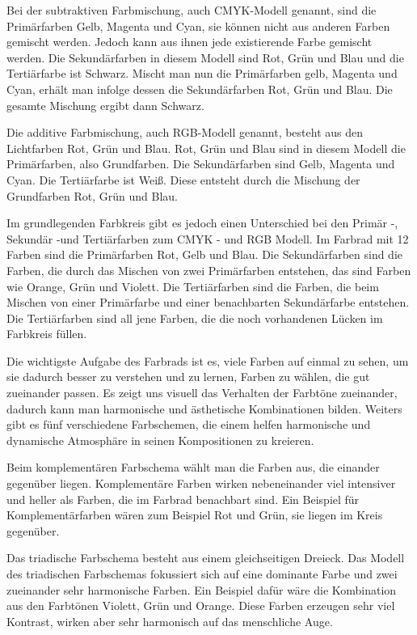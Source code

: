 Bei der subtraktiven Farbmischung, auch CMYK-Modell genannt, sind die Primärfarben Gelb, Magenta und Cyan, sie können nicht aus anderen Farben gemischt werden. Jedoch kann aus ihnen jede existierende Farbe gemischt werden. Die Sekundärfarben in diesem Modell sind Rot, Grün und Blau und die Tertiärfarbe ist Schwarz. Mischt man nun die Primärfarben gelb, Magenta und Cyan, erhält man infolge dessen die Sekundärfarben Rot, Grün und Blau. Die gesamte Mischung ergibt dann Schwarz.

Die additive Farbmischung, auch RGB-Modell genannt, besteht aus den Lichtfarben Rot, Grün und Blau. Rot, Grün und Blau sind in diesem Modell die Primärfarben, also Grundfarben. Die Sekundärfarben sind Gelb, Magenta und Cyan. Die Tertiärfarbe ist Weiß. Diese entsteht durch die Mischung der Grundfarben Rot, Grün und Blau.

Im grundlegenden Farbkreis gibt es jedoch einen Unterschied bei den Primär -, Sekundär -und Tertiärfarben zum CMYK - und RGB Modell. Im Farbrad mit 12 Farben sind die Primärfarben Rot, Gelb und Blau. Die Sekundärfarben sind die Farben, die durch das Mischen von zwei Primärfarben entstehen, das sind Farben wie Orange, Grün und Violett. Die Tertiärfarben sind die Farben, die beim Mischen von einer Primärfarbe und einer benachbarten Sekundärfarbe entstehen. Die Tertiärfarben sind all jene Farben, die die noch vorhandenen Lücken im Farbkreis füllen.


Die wichtigste Aufgabe des Farbrads ist es, viele Farben auf einmal zu sehen, um sie dadurch besser zu verstehen und zu lernen, Farben zu wählen, die gut zueinander passen. Es zeigt uns visuell das Verhalten der Farbtöne zueinander, dadurch kann man harmonische und ästhetische Kombinationen bilden.
Weiters gibt es fünf verschiedene Farbschemen, die einem helfen harmonische und dynamische Atmosphäre in seinen Kompositionen zu kreieren.

Beim komplementären Farbschema wählt man die Farben aus, die einander gegenüber liegen. Komplementäre Farben wirken nebeneinander viel intensiver und heller als Farben, die im Farbrad benachbart sind. Ein Beispiel für Komplementärfarben wären zum Beispiel Rot und Grün, sie liegen im Kreis gegenüber.

Das triadische Farbschema besteht aus einem gleichseitigen Dreieck. Das Modell des triadischen Farbschemas fokussiert sich auf eine dominante Farbe und zwei zueinander sehr harmonische Farben. Ein Beispiel dafür wäre die Kombination aus den Farbtönen Violett, Grün und Orange. Diese Farben erzeugen sehr viel Kontrast, wirken aber sehr harmonisch auf das menschliche Auge. 

